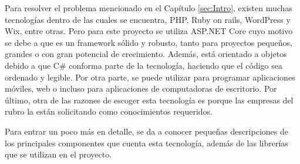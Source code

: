Para resolver el problema mencionado en el Capítulo \ref{sec:Intro}, existen muchas tecnologías dentro de las cuales se encuentra, PHP, Ruby on rails, WordPress y Wix, entre otras. Pero para este proyecto se utiliza ASP.NET Core cuyo motivo se debe a que es un framework sólido y robusto, tanto para proyectos pequeños, grandes o con gran potencial de crecimiento. Además, está orientado a objetos debido a que C\# conforma parte de la tecnología, haciendo que el código sea ordenado y legible. Por otra parte, se puede utilizar para programar aplicaciones móviles, web o incluso para aplicaciones de computadoras de escritorio. Por último, otra de las razones de escoger esta tecnología es porque las empresas del rubro la están solicitando como conocimientos requeridos. 

Para entrar un poco más en detalle, se da a conocer pequeñas descripciones de los principales componentes que cuenta esta tecnología, además de las librerías que se utilizan en el proyecto.


